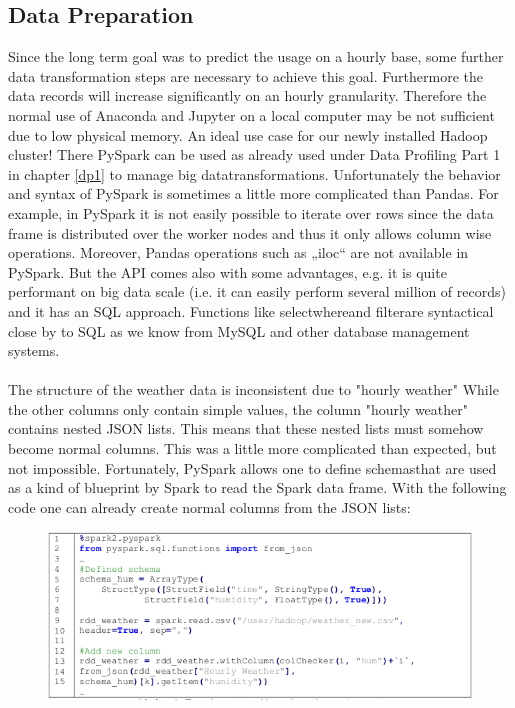 \subsection{Data Preparation}\label{sec:dphourly}
Since the long term goal was to predict the usage on a hourly base, some further data
transformation steps are necessary to achieve this goal. Furthermore the data records will
increase significantly on an hourly granularity. Therefore the normal use of Anaconda and Jupyter
on a local computer may be not sufficient due to low physical memory. An ideal use case for our
newly installed Hadoop cluster! There PySpark can be used as already used under Data Profiling
Part 1 in chapter \ref{dp1} to manage \glqq big data\grqq transformations. Unfortunately the behavior and syntax of PySpark
is sometimes a little more complicated than Pandas. For example, in PySpark it is not easily
possible to iterate over rows since the data frame is distributed over the worker nodes and thus it
only allows column wise operations. Moreover, Pandas operations such as „iloc“ are not available
in PySpark. But the API comes also with some advantages, e.g. it is quite performant on big data
scale (i.e. it can easily perform several million of records) and it has an SQL approach.
Functions like \glqq select\grqq \glqq where\grqq and \glqq filter\grqq are syntactical close by to SQL as we know from MySQL
and other database management systems.\\\\
The structure of the weather data is inconsistent due to "hourly weather"  While the other columns
only contain simple values, the column "hourly weather" contains nested JSON lists. This means
that these nested lists must somehow become normal columns. This was a little more complicated
than expected, but not impossible. Fortunately, PySpark allows one to define \glqq schemas\grqq that are
used as a kind of blueprint by Spark to read the Spark data frame. With the following code one
can already create normal columns from the JSON lists:
\begin{figure}[H]
\hspace{-1.6cm}
\includegraphics[width=1.2\textwidth]{img/listing5}\label{fig:listing5}
\label{fig:listing5}
\end{figure}
